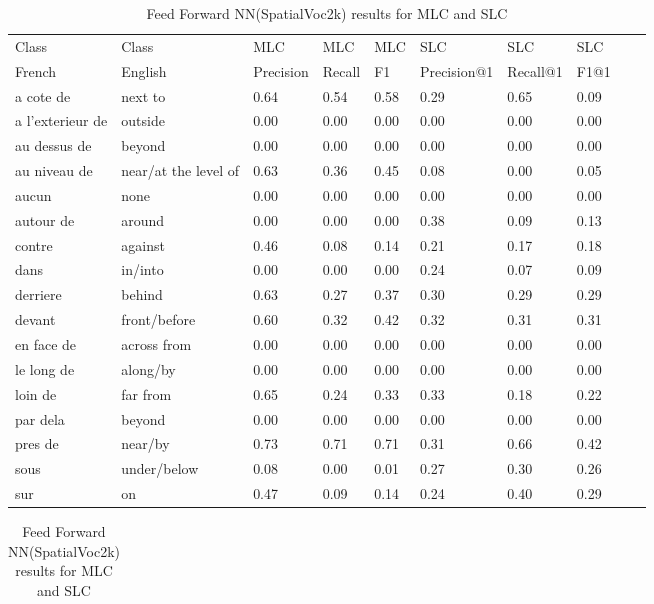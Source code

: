 \documentclass{csfyp}
\begin{document}
\begin{table}[!htbp]
\centering
\begin{tabular}{|l|l|l|l|l|l|l|l|l|l}
\cline{1-8}
Class & Class & MLC  &  MLC  &  MLC & SLC &  SLC & SLC \\ \cline{1-8}
French & English & Precision &  Recall    & F1 & Precision@1 & Recall@1 & F1@1 \\ \cline{1-8}
a cote de	&	next to	&	0.64	&	0.54	&	0.58	&	0.29	&	0.65	&	0.09 \\ \cline{1-8}
a l'exterieur de	&	outside	&	0.00	&	0.00	&	0.00	&	0.00	&	0.00	&	0.00 \\ \cline{1-8}
au dessus de	&	beyond	&	0.00	&	0.00	&	0.00	&	0.00	&	0.00	&	0.00 \\ \cline{1-8}
au niveau de	&	near/at the level of	&	0.63	&	0.36	&	0.45	&	0.08	&	0.00	&	0.05 \\ \cline{1-8}
aucun	&	none	&	0.00	&	0.00	&	0.00	&	0.00	&	0.00	&	0.00 \\ \cline{1-8}
autour de	&	around	&	0.00	&	0.00	&	0.00	&	0.38	&	0.09	&	0.13 \\ \cline{1-8}
contre	&	against	&	0.46	&	0.08	&	0.14	&	0.21	&	0.17	&	0.18 \\ \cline{1-8}
dans	&	in/into	&	0.00	&	0.00	&	0.00	&	0.24	&	0.07	&	0.09 \\ \cline{1-8}
derriere	&	behind	&	0.63	&	0.27	&	0.37	&	0.30	&	0.29	&	0.29 \\ \cline{1-8}
devant	&	front/before	&	0.60	&	0.32	&	0.42	&	0.32	&	0.31	&	0.31 \\ \cline{1-8}
en face de	&	across from	&	0.00	&	0.00	&	0.00	&	0.00	&	0.00	&	0.00 \\ \cline{1-8}
le long de	&	along/by	&	0.00	&	0.00	&	0.00	&	0.00	&	0.00	&	0.00 \\ \cline{1-8}
loin de	&	far from	&	0.65	&	0.24	&	0.33	&	0.33	&	0.18	&	0.22 \\ \cline{1-8}
par dela	&	beyond	&	0.00	&	0.00	&	0.00	&	0.00	&	0.00	&	0.00 \\ \cline{1-8}
pres de	&	near/by	&	0.73	&	0.71	&	0.71	&	0.31	&	0.66	&	0.42 \\ \cline{1-8}
sous	&	under/below	&	0.08	&	0.00	&	0.01	&	0.27	&	0.30	&	0.26 \\ \cline{1-8}
sur	&	on	&	0.47	&	0.09	&	0.14	&	0.24	&	0.40	&	0.29 \\ \cline{1-8}
\end{tabular}
\caption{Feed Forward NN(SpatialVoc2k) results for MLC and SLC}
\centering
\begin{tabular}{|l|l|l|l|l|l|l|l|l}
\cline{1-7}

\end{tabular}
\end{table}
\end{document}
